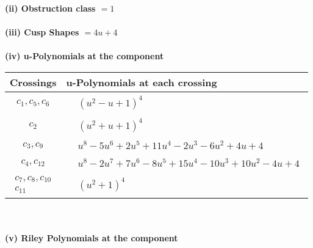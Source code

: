 \documentclass[1p]{elsarticle_modified}
\theoremstyle{definition}
\begin{document}
\flushleft \textbf{(ii) Obstruction class $= 1$}\\~\\
\flushleft \textbf{(iii) Cusp Shapes $= 4 u+4$}\\~\\
\newpage\renewcommand{\arraystretch}{1}
\flushleft \textbf{(iv) u-Polynomials at the component}\newline \\
\begin{tabular}{m{50pt}|m{274pt}}
Crossings & \hspace{64pt}u-Polynomials at each crossing \\
\hline $$\begin{aligned}c_{1},c_{5},c_{6}\end{aligned}$$&$\begin{aligned}
&(u^2- u+1)^4
\end{aligned}$\\
\hline $$\begin{aligned}c_{2}\end{aligned}$$&$\begin{aligned}
&(u^2+u+1)^4
\end{aligned}$\\
\hline $$\begin{aligned}c_{3},c_{9}\end{aligned}$$&$\begin{aligned}
&u^8-5 u^6+2 u^5+11 u^4-2 u^3-6 u^2+4 u+4
\end{aligned}$\\
\hline $$\begin{aligned}c_{4},c_{12}\end{aligned}$$&$\begin{aligned}
&u^8-2 u^7+7 u^6-8 u^5+15 u^4-10 u^3+10 u^2-4 u+4
\end{aligned}$\\
\hline $$\begin{aligned}c_{7},c_{8},c_{10}\\c_{11}\end{aligned}$$&$\begin{aligned}
&(u^2+1)^4
\end{aligned}$\\
\hline
\end{tabular}\\~\\
\newpage\renewcommand{\arraystretch}{1}
\flushleft \textbf{(v) Riley Polynomials at the component}\newline \\
\end{document}
